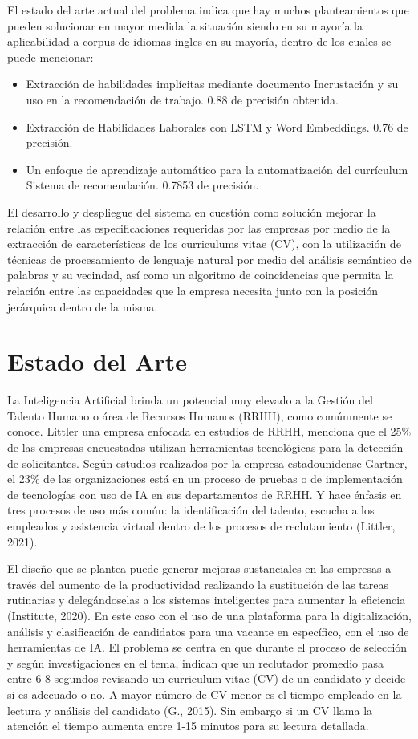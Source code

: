\documentclass[a4paper]{jpconf}
\begin{document}
El estado del arte actual del problema indica que hay muchos planteamientos que pueden solucionar en mayor medida la situación siendo en su mayoría la aplicabilidad a corpus de idiomas ingles en su mayoría, dentro de los cuales se puede mencionar:

\begin{itemize}
    \item Extracción de habilidades implícitas mediante documento Incrustación y su uso en la recomendación de trabajo. 0.88 de precisión obtenida.
    \item Extracción de Habilidades Laborales con LSTM y Word Embeddings. 0.76 de precisión.
	\item Un enfoque de aprendizaje automático para la automatización del currículum Sistema de recomendación. 0.7853 de precisión.
\end{itemize}

El desarrollo y despliegue del sistema en cuestión como solución mejorar la relación entre las especificaciones requeridas por las empresas por medio de la extracción de características de los curriculums vitae (CV), con la utilización de técnicas de procesamiento de lenguaje natural por medio del análisis semántico de palabras y su vecindad, así como un algoritmo de coincidencias que permita la relación entre las capacidades que la empresa necesita junto con la posición jerárquica dentro de la misma.


\section{Estado del Arte}
La Inteligencia Artificial brinda un potencial muy elevado a la Gestión del Talento Humano o área de Recursos Humanos (RRHH), como comúnmente se conoce. Littler una empresa enfocada en estudios de RRHH, menciona que el 25\% de las empresas encuestadas utilizan herramientas tecnológicas para la detección de solicitantes. Según estudios realizados por la empresa estadounidense Gartner, el 23\% de las organizaciones está en un proceso de pruebas o de implementación de tecnologías con uso de IA en sus departamentos de RRHH. Y hace énfasis en tres procesos de uso más común: la identificación del talento, escucha a los empleados y asistencia virtual dentro de los procesos de reclutamiento (Littler, 2021).

El diseño que se plantea puede generar mejoras sustanciales en las empresas a través del aumento de la productividad realizando la sustitución de las tareas rutinarias y delegándoselas a los sistemas inteligentes para aumentar la eficiencia (Institute, 2020). En este caso con el uso de una plataforma para la digitalización, análisis y clasificación de candidatos para una vacante en específico, con el uso de herramientas de IA. El problema se centra en que durante el proceso de selección y según investigaciones en el tema, indican que un reclutador promedio pasa entre 6-8 segundos revisando un curriculum vitae (CV) de un candidato y decide si es adecuado o no. A mayor número de CV menor es el tiempo empleado en la lectura y análisis del candidato (G., 2015). Sin embargo si un CV llama la atención el tiempo aumenta entre 1-15 minutos para su lectura detallada.
\end{document}
